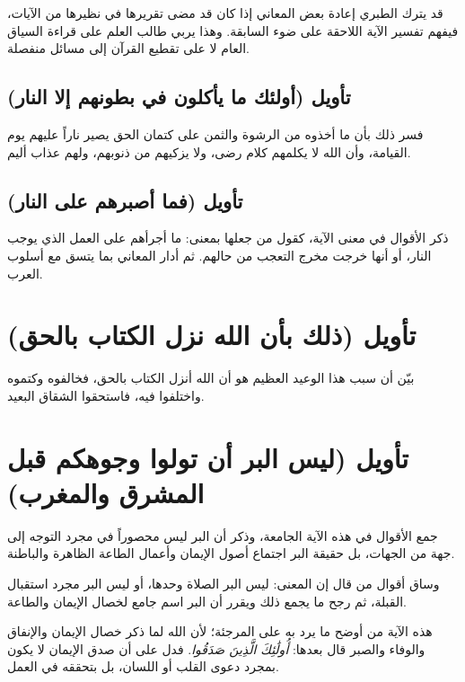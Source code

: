 \begin{fawaid}
قد يترك الطبري إعادة بعض المعاني إذا كان قد مضى تقريرها في نظيرها من الآيات، فيفهم تفسير الآية اللاحقة على ضوء السابقة. وهذا يربي طالب العلم على قراءة السياق العام لا على تقطيع القرآن إلى مسائل منفصلة.
\end{fawaid}

\subsection{تأويل (أولئك ما يأكلون في بطونهم إلا النار)}
فسر  ذلك بأن ما أخذوه من الرشوة والثمن على كتمان الحق يصير ناراً عليهم يوم القيامة، وأن الله لا يكلمهم كلام رضى، ولا يزكيهم من ذنوبهم، ولهم عذاب أليم.

\subsection{تأويل (فما أصبرهم على النار)}
ذكر  الأقوال في معنى الآية، كقول من جعلها بمعنى: ما أجرأهم على العمل الذي يوجب النار، أو أنها خرجت مخرج التعجب من حالهم. ثم أدار المعاني بما يتسق مع أسلوب العرب.

\separator

\section{تأويل (ذلك بأن الله نزل الكتاب بالحق)}
بيّن  أن سبب هذا الوعيد العظيم هو أن الله أنزل الكتاب بالحق، فخالفوه وكتموه واختلفوا فيه، فاستحقوا الشقاق البعيد.

\separator

\section{تأويل (ليس البر أن تولوا وجوهكم قبل المشرق والمغرب)}
جمع  الأقوال في هذه الآية الجامعة، وذكر أن البر ليس محصوراً في مجرد التوجه إلى جهة من الجهات، بل حقيقة البر اجتماع أصول الإيمان وأعمال الطاعة الظاهرة والباطنة.

وساق أقوال من قال إن المعنى: ليس البر الصلاة وحدها، أو ليس البر مجرد استقبال القبلة، ثم رجح ما يجمع ذلك ويقرر أن البر اسم جامع لخصال الإيمان والطاعة.

\begin{fawaid}
هذه الآية من أوضح ما يرد به على المرجئة؛ لأن الله لما ذكر خصال الإيمان والإنفاق والوفاء والصبر قال بعدها: \textit{أُولَٰئِكَ الَّذِينَ صَدَقُوا}. فدل على أن صدق الإيمان لا يكون بمجرد دعوى القلب أو اللسان، بل بتحققه في العمل.
\end{fawaid}

